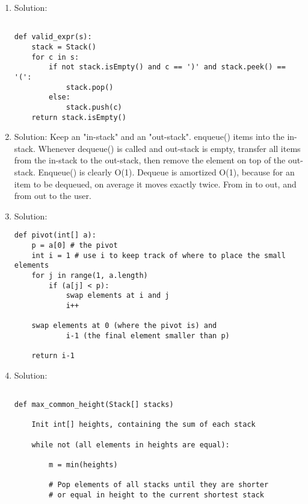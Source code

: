 \documentclass{article}
\begin{document}
\begin{enumerate}


\item Solution:

\begin{lstlisting}

def valid_expr(s):
    stack = Stack()
    for c in s:
        if not stack.isEmpty() and c == ')' and stack.peek() == '(':
            stack.pop()
        else:
            stack.push(c)
    return stack.isEmpty()

\end{lstlisting}

\item Solution: Keep an "in-stack" and an "out-stack". enqueue() items into the in-stack. Whenever dequeue() is called and out-stack is empty, transfer all items from the in-stack to the out-stack, then remove the element on top of the out-stack. Enqueue() is clearly O(1). Dequeue is amortized O(1), because for an item to be dequeued, on average it moves exactly twice. From in to out, and from out to the user.

\item Solution:

\begin{lstlisting}
def pivot(int[] a):
    p = a[0] # the pivot
    int i = 1 # use i to keep track of where to place the small elements
    for j in range(1, a.length)
        if (a[j] < p):
            swap elements at i and j
            i++
            
    swap elements at 0 (where the pivot is) and
            i-1 (the final element smaller than p)
            
    return i-1

\end{lstlisting}

\item Solution:

\begin{lstlisting}

def max_common_height(Stack[] stacks)

    Init int[] heights, containing the sum of each stack
    
    while not (all elements in heights are equal):
    
        m = min(heights)
        
        # Pop elements of all stacks until they are shorter
        # or equal in height to the current shortest stack
        

\end{lstlisting}
\end{enumerate}
\end{document}
